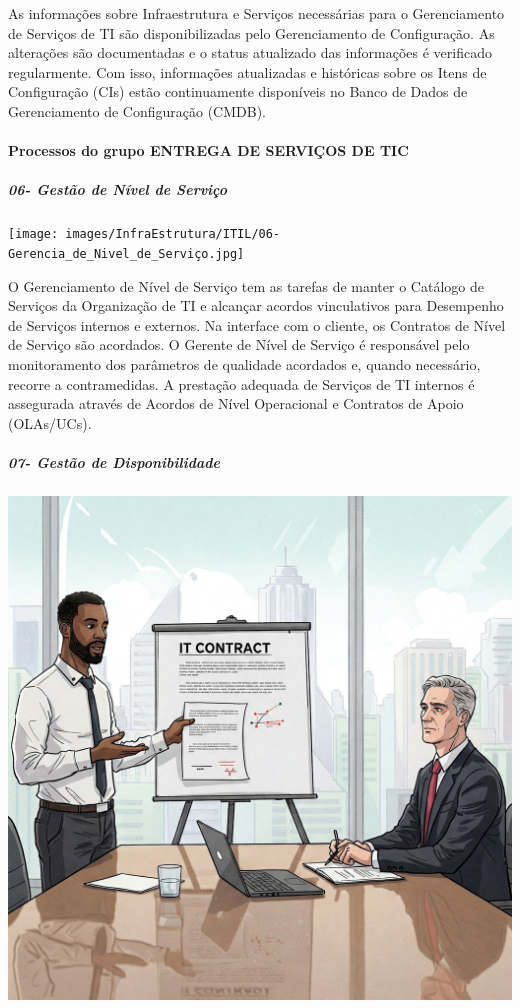 \documentclass[
]{book}
\begin{document}
As informações sobre Infraestrutura e Serviços necessárias para o Gerenciamento de Serviços de TI são disponibilizadas pelo Gerenciamento de Configuração. As alterações são documentadas e o status atualizado das informações é verificado regularmente. Com isso, informações atualizadas e históricas sobre os Itens de Configuração (CIs) estão continuamente disponíveis no Banco de Dados de Gerenciamento de Configuração (CMDB).

\paragraph{Processos do grupo ENTREGA DE SERVIÇOS DE TIC}\label{processos-do-grupo-entrega-de-serviuxe7os-de-tic}

\subparagraph{06- Gestão de Nível de Serviço}\label{gestuxe3o-de-nuxedvel-de-serviuxe7o}

\texttt{[image: images/InfraEstrutura/ITIL/06-Gerencia\_de\_Nivel\_de\_Serviço.jpg]}

O Gerenciamento de Nível de Serviço tem as tarefas de manter o Catálogo de Serviços da Organização de TI e alcançar acordos vinculativos para Desempenho de Serviços internos e externos. Na interface com o cliente, os Contratos de Nível de Serviço são acordados. O Gerente de Nível de Serviço é responsável pelo monitoramento dos parâmetros de qualidade acordados e, quando necessário, recorre a contramedidas. A prestação adequada de Serviços de TI internos é assegurada através de Acordos de Nível Operacional e Contratos de Apoio (OLAs/UCs).

\subparagraph{07- Gestão de Disponibilidade}\label{gestuxe3o-de-disponibilidade}

\includegraphics{images/InfraEstrutura/ITIL/07-gerenciamento_de_disponibilidade.jpg}
\end{document}
